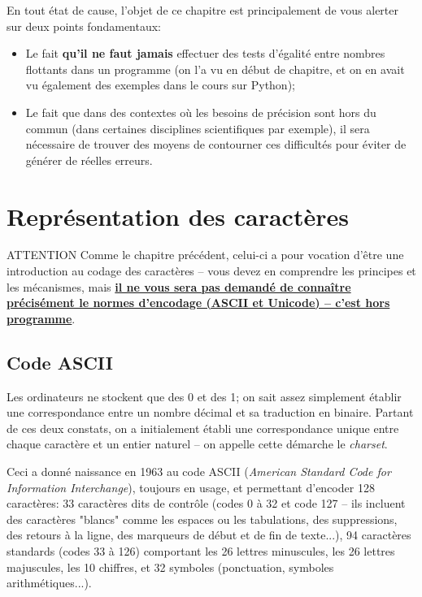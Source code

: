 \documentclass[12pt]{article}
\begin{document}
	
	En tout état de cause, l'objet de ce chapitre est principalement de vous alerter sur deux points fondamentaux:
	
	\begin{itemize}
		\item Le fait \textbf{qu'il ne faut jamais} effectuer des tests d'égalité entre nombres flottants dans un programme (on l'a vu en début de chapitre, et on en avait vu également des exemples dans le cours sur Python);
		\item Le fait que dans des contextes où les besoins de précision sont hors du commun (dans certaines disciplines scientifiques par exemple), il sera nécessaire de trouver des moyens de contourner ces difficultés pour éviter de générer de réelles erreurs.
	\end{itemize}
	
	\pagebreak
	
	\section{Représentation des caractères}
	
	\begin{MonAmp}{ATTENTION}
		Comme le chapitre précédent, celui-ci a pour vocation d'être une introduction au codage des caractères -- vous devez en comprendre les principes et les mécanismes, mais \textbf{\uline{il ne vous sera pas demandé de connaître précisément le normes d'encodage (ASCII et Unicode) -- c'est hors programme}}. 	\end{MonAmp}
	
	\subsection{Code ASCII}
	
	Les ordinateurs ne stockent que des 0 et des 1; on sait assez simplement établir une correspondance entre un nombre décimal et sa traduction en binaire. Partant de ces deux constats, on a initialement établi une correspondance unique entre chaque caractère et un entier naturel -- on appelle cette démarche le \textit{charset}.
	
	Ceci a donné naissance en 1963 au code ASCII (\textit{American Standard Code for Information Interchange}), toujours en usage, et permettant d'encoder 128 caractères: 33 caractères dits de contrôle (codes 0 à 32 et code 127 -- ils incluent des caractères "blancs" comme les espaces ou les tabulations, des suppressions, des retours à la ligne, des marqueurs de début et de fin de texte...), 94 caractères standards (codes 33 à 126) comportant les 26 lettres minuscules, les 26 lettres majuscules, les 10 chiffres, et 32 symboles (ponctuation, symboles arithmétiques...).
	
\end{document}
